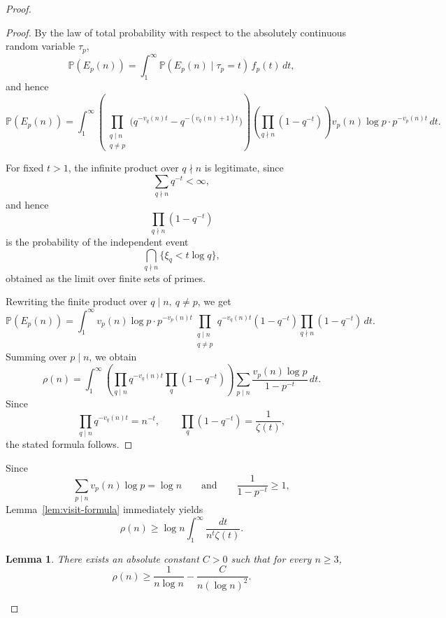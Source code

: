 \documentclass[11pt,letterpaper,reqno]{amsart}
\newtheorem{lemma}[theorem]{Lemma}
\theoremstyle{definition}
\numberwithin{equation}{section}
\newcommand{\1}{\mathbf 1}
\begin{document}
\begin{proof}
\begin{proof}
By the law of total probability with respect to the absolutely continuous random variable \(\tau_p\),
\[
\mathbb P(E_p(n))
=
\int_1^\infty \mathbb P(E_p(n)\mid \tau_p=t)\,f_p(t)\,dt,
\]
and hence
\[
\mathbb P(E_p(n))
=
\int_1^\infty
\left(
\prod_{\substack{q\mid n\\ q\ne p}}
\bigl(q^{-v_q(n)t}-q^{-(v_q(n)+1)t}\bigr)
\right)
\left(
\prod_{q\nmid n}(1-q^{-t})
\right)
v_p(n)\log p\cdot p^{-v_p(n)t}\,dt.
\]

For fixed \(t>1\), the infinite product over \(q\nmid n\) is legitimate, since
\[
\sum_{q\nmid n} q^{-t}<\infty,
\]
and hence
\[
\prod_{q\nmid n}(1-q^{-t})
\]
is the probability of the independent event
\[
\bigcap_{q\nmid n}\{\xi_q<t\log q\},
\]
obtained as the limit over finite sets of primes.

Rewriting the finite product over \(q\mid n,\ q\ne p\), we get
\[
\mathbb P(E_p(n))
=
\int_1^\infty
v_p(n)\log p\cdot p^{-v_p(n)t}
\prod_{\substack{q\mid n\\ q\ne p}} q^{-v_q(n)t}(1-q^{-t})
\prod_{q\nmid n}(1-q^{-t})\,dt.
\]
Summing over \(p\mid n\), we obtain
\[
\rho(n)
=
\int_1^\infty
\left(
\prod_{q\mid n} q^{-v_q(n)t}
\prod_q(1-q^{-t})
\right)
\sum_{p\mid n}\frac{v_p(n)\log p}{1-p^{-t}}\,dt.
\]
Since
\[
\prod_{q\mid n} q^{-v_q(n)t}=n^{-t},
\qquad
\prod_q(1-q^{-t})=\frac{1}{\zeta(t)},
\]
the stated formula follows.
\end{proof}
Since
\[
\sum_{p\mid n} v_p(n)\log p=\log n
\qquad\text{and}\qquad
\frac{1}{1-p^{-t}}\ge 1,
\]
Lemma~\ref{lem:visit-formula} immediately yields
\begin{equation}\label{eq:pi-lower-1}
\rho(n)\ge \log n\int_1^\infty \frac{dt}{n^t\zeta(t)}.
\end{equation}

\begin{lemma}\label{lem:pi-lower-2}
There exists an absolute constant $C>0$ such that for every $n\ge 3$,
\[
\rho(n)\ge \frac{1}{n\log n}-\frac{C}{n(\log n)^2}.
\]
\end{lemma}


\end{proof}
\end{document}
